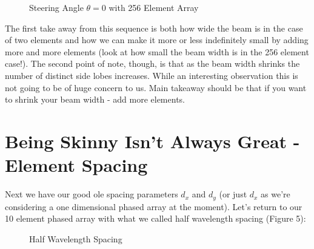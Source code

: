 \documentclass[12pt,a6paper]{book}
\begin{document}
\begin{figure}[!htb]
\caption{\label{fig:my-label} Steering Angle $\theta=0$ with 256 Element Array}
\end{figure}

The first take away from this sequence is both how wide the beam is in the case of two elements and how we can make it more or less indefinitely small by adding more and more elements (look at how small the beam width is in the 256 element case!). The second point of note, though, is that as the beam width shrinks the number of distinct side lobes increases. While an interesting observation this is not going to be of huge concern to us. Main takeaway should be that if you want to shrink your beam width - add more elements. 

\section{Being Skinny Isn't Always Great - Element Spacing}
Next we have our good ole spacing parameters $d_x$ and $d_y$ (or just $d_x$ as we're considering a one dimensional phased array at the moment). Let's return to our 10 element phased array with what we called half wavelength spacing (Figure 5):

\begin{figure}[!htb]
\caption{\label{fig:my-label} Half Wavelength Spacing}
\end{figure}
\end{document}

